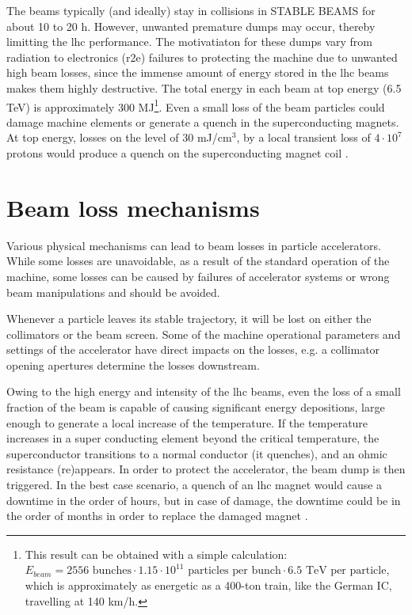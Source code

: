 \documentclass[encoding=utf8,british]{tumphthesis}
\begin{document}
The beams typically (and ideally) stay in collisions in STABLE BEAMS for about 10 to 20 h. However, unwanted premature dumps may occur, thereby limitting the \acrshort{lhc} performance. The motivatiaton for these dumps vary from radiation to electronics (\acrshort{r2e}) failures to protecting the machine due to unwanted high beam losses, since the immense amount of energy stored in the \acrshort{lhc} beams makes them highly destructive. The total energy in each beam at top energy (6.5 TeV) is approximately 300 MJ\footnote{This result can be obtained with a simple calculation: $E_{beam} = 2556 \text{ bunches} \cdot 1.15 \cdot 10^{11} \text{ particles per bunch} \cdot 6.5 \text{ TeV per particle}$, which is approximately as energetic as a 400-ton train, like the German IC, travelling at 140 km/h.}. Even a small loss of the beam particles could damage machine elements or generate a quench in the superconducting magnets. At top energy, losses on the level of 30 mJ/cm$^3$, by a local transient loss of $4\cdot 10^7$ protons would produce a quench on the superconducting magnet coil \cite{LHC-design-report}. 




\section{Beam loss mechanisms}
\label{section:beam-loss-mechanisms}
Various physical mechanisms can lead to beam losses in particle accelerators. While some losses are unavoidable, as a result of the standard operation of the machine, some losses can be caused by failures of accelerator systems or wrong beam manipulations and should be avoided. 

Whenever a particle leaves its stable trajectory, it will be lost on either the collimators or the beam screen. Some of the machine operational parameters and settings of the accelerator have direct impacts on the losses, e.g. a collimator opening apertures determine the losses downstream. 

Owing to the high energy and intensity of the \acrshort{lhc} beams, even the loss of a small fraction of the beam is capable of causing significant energy depositions, large enough to generate a local increase of the temperature. If the temperature increases in a super conducting element beyond the critical temperature, the superconductor transitions to a normal conductor (it quenches), and an ohmic resistance (re)appears. In order to protect the accelerator, the beam dump is then triggered. In the best case scenario, a quench of an \acrshort{lhc} magnet would cause a downtime in the order of hours, but in case of damage, the downtime could be in the order of months in order to replace the damaged magnet \cite{Zamantzas:976628,Friesenbichler:570940}.   
\end{document}
